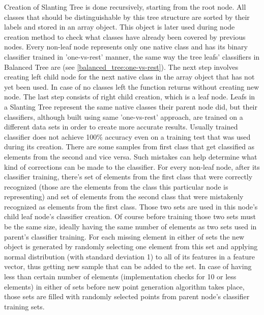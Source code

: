 \label{slanting_tree_implementation}Creation of Slanting Tree is done recursively, starting from the root node. All classes that should be distinguishable by this tree structure are sorted by their labels and stored in an array object. This object is later used during node creation method to check what classes have already been covered by previous nodes. Every non-leaf node represents only one native class and has its binary classifier trained in 'one-vs-rest' manner, the same way the tree leafs' classifiers in Balanced Tree are (see \ref{balanced_tree:one-vs-rest}). The next step involves creating left child node for the next native class in the array object that has not yet been used. In case of no classes left the function returns without creating new node. The last step consists of right child creation, which is a leaf node. Leafs in a Slanting Tree represent the same native classes their parent node did, but their classifiers, although built using same 'one-vs-rest' approach, are trained on a different data sets in order to create more accurate results. Usually trained classifier does not achieve 100\% accuracy even on a training test that was used during its creation. There are some samples from first class that get classified as elements from the second and vice versa. Such mistakes can help determine what kind of corrections can be made to the classifier. For every non-leaf node, after its classifier training, there's set of elements from the first class that were correctly recognized (those are the elements from the class this particular node is representing) and set of elements from the second class that were mistakenly recognized as elements from the first class. Those two sets are used in this node's child leaf node's classifier creation. Of course before training those two sets must be the same size, ideally having the same number of elements as two sets used in parent's classifier training. For each missing element in either of sets the new object is generated by randomly selecting one element from this set and applying normal distribution (with standard deviation 1) to all of its features in a feature vector, thus getting new sample that can be added to the set. In case of having less than certain number of elements (implementation checks for 10 or less elements) in either of sets before new point generation algorithm takes place, those sets are filled with randomly selected points from parent node's classifier training sets.

